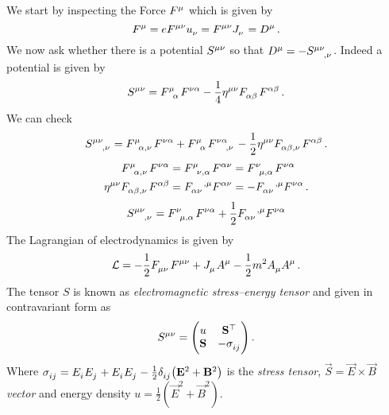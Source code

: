 \begin{example}[Electrodynamics]
We start by inspecting the  Force $\tensor{F}{^\mu}$ which is
given by
\begin{equation}
    \tensor{F}{^\mu}=e\tensor{F}{^\mu^\nu}\tensor{u}{_\nu}=\tensor{F}{^\mu^\nu}\tensor{J}{_\nu}=\tensor{D}{^\mu}\,
    .
\end{equation}
We now ask whether there is a potential $\tensor{S}{^\mu^\nu}$ so that
$\tensor{D}{^\mu}=-\tensor{S}{^\mu^\nu_{,\nu}}$. Indeed a potential is given by
\begin{equation}
    \tensor{S}{^\mu^\nu}=\tensor{F}{^\mu_\alpha}\tensor{F}{^\nu^\alpha}-\frac{1}{4}\tensor{\eta}{^\mu^\nu}\tensor{F}{_\alpha_\beta}\tensor{F}{^\alpha^\beta}\,
    .
\end{equation}
We can check
\begin{equation}
    \tensor{S}{^\mu^\nu_{,\nu}}=\tensor{F}{^\mu_\alpha_{,\nu}}\tensor{F}{^\nu^\alpha}+
    \tensor{F}{^\mu_\alpha}\tensor{F}{^\nu^\alpha_{,\nu}}
    -\frac{1}{2}\tensor{\eta}{^\mu^\nu}\tensor{F}{_\alpha_\beta_{,\nu}}\tensor{F}{^\alpha^\beta}\,
    .
\end{equation}
\begin{align}
    \tensor{F}{^\mu_\alpha_{,\nu}}\tensor{F}{^\nu^\alpha}
    &=\tensor{F}{^\mu_\nu_{,\alpha}}\tensor{F}{^\alpha^\nu}
    =\tensor{F}{^\nu_\mu_{,\alpha}}\tensor{F}{^\nu^\alpha}
    \\
    \tensor{\eta}{^\mu^\nu}\tensor{F}{_\alpha_\beta_{,\nu}}\tensor{F}{^\alpha^\beta}
    &=\tensor{F}{_\alpha_\nu^{,\mu}}\tensor{F}{^\alpha^\nu}
    = -\tensor{F}{_\alpha_\nu^{,\mu}}\tensor{F}{^\nu^\alpha}
    \,
    .
\end{align}
\begin{equation}
    \tensor{S}{^\mu^\nu_{,\nu}}=\tensor{F}{^\nu_\mu_{,\alpha}}\tensor{F}{^\nu^\alpha}
    +\frac{1}{2}\tensor{F}{_\alpha_\nu^{,\mu}}\tensor{F}{^\nu^\alpha}
\end{equation}
The Lagrangian of electrodynamics is given by
\begin{equation}
    \mathcal{L}=-\frac{1}{2}\tensor{F}{_\mu_\nu}\tensor{F}{^\mu^\nu}+\tensor{J}{_\mu}\tensor{A}{^\mu}-\frac{1}{2}m^2\tensor{A}{_\mu}\tensor{A}{^\mu}\,
    .
\end{equation}
The tensor $S$ is known as \emph{electromagnetic stress–energy tensor} and
given in contravariant form as
\begin{equation}
    \tensor{S}{^\mu^\nu}=
    \begin{pmatrix}
        u&\vec{S}\transpose\\
        \vec{S}& -\tensor{\sigma}{_i_j}
    \end{pmatrix}\,.
\end{equation}
Where
$\tensor{\sigma}{_i_j}=\tensor{E}{_i}\tensor{E}{_j}+\tensor{E}{_i}\tensor{E}{_j}-\frac{1}{2}\tensor{\delta}{_i_j}\left(\vec{E}^2+\vec{B}^2\right)$
is the \emph{ stress tensor}, $\vec{S}=\vec{E}\times\vec{B}$
\emph{ vector} and energy density $u
=\frac{1}{2}\left(\vec{E}^2+\vec{B}^2\right)$.
\end{example}

